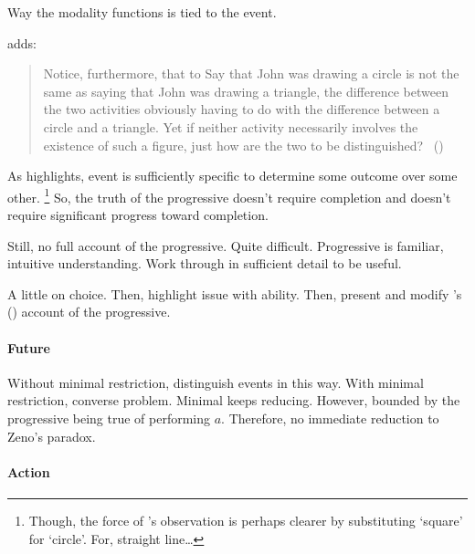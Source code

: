 \begin{note}
  Way the modality functions is tied to the event.

  \citeauthor{Dowty:1979vq} adds:
  \begin{quote}
    Notice, furthermore, that to Say that John was drawing a circle is not the same as saying that John was drawing a triangle, the difference between the two activities obviously having to do with the difference between a circle and a triangle.
    Yet if neither activity necessarily involves the existence of such a figure, just how are the two to be distinguished?%
    \mbox{ }\hfill\mbox{(\citeyear[133]{Dowty:1979vq})}
  \end{quote}

  As \citeauthor{Dowty:1979vq} highlights, event is sufficiently specific to determine some outcome over some other.%
  \footnote{
    Though, the force of \citeauthor{Dowty:1979vq}'s observation is perhaps clearer by substituting `square' for `circle'.
    For, straight line\dots
  }
  So, the truth of the progressive doesn't require completion and doesn't require significant progress toward completion.
\end{note}

\begin{note}
  Still, no full account of the progressive.
  Quite difficult.
  Progressive is familiar, intuitive understanding.
  Work through in sufficient detail to be useful.

  A little on choice.
  Then, highlight issue with ability.
  Then, present and modify \citeauthor{Landman:1992wh}'s (\citeyear{Landman:1992wh}) account of the progressive.
\end{note}


\paragraph{Future}

\begin{note}[Racing]
  Without minimal restriction, distinguish events in this way.
  With minimal restriction, converse problem.
  Minimal keeps reducing.
  However, bounded by the progressive being true of performing \(a\).
  Therefore, no immediate reduction to Zeno's paradox.
\end{note}


\paragraph{Action}

